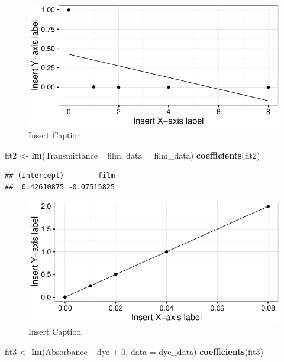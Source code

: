 \documentclass[]{article}
\newenvironment{Shaded}{\begin{snugshade}}{\end{snugshade}}
\newcommand{\KeywordTok}[1]{\textcolor[rgb]{0.13,0.29,0.53}{\textbf{{#1}}}}
\newcommand{\DataTypeTok}[1]{\textcolor[rgb]{0.13,0.29,0.53}{{#1}}}
\newcommand{\DecValTok}[1]{\textcolor[rgb]{0.00,0.00,0.81}{{#1}}}
\newcommand{\StringTok}[1]{\textcolor[rgb]{0.31,0.60,0.02}{{#1}}}
\newcommand{\NormalTok}[1]{{#1}}
\begin{document}
\begin{figure}[htbp]
\centering
\includegraphics{Beers_Law_files/figure-latex/unnamed-chunk-2-1.pdf}
\caption{Insert Caption}
\end{figure}

\begin{Shaded}
\begin{Highlighting}[]
\NormalTok{fit2 <-}\StringTok{ }\KeywordTok{lm}\NormalTok{(Transmittance ~}\StringTok{ }\NormalTok{film, }\DataTypeTok{data =} \NormalTok{film_data)}
\KeywordTok{coefficients}\NormalTok{(fit2)}
\end{Highlighting}
\end{Shaded}

\begin{verbatim}
## (Intercept)        film 
##  0.42610875 -0.07515825
\end{verbatim}

\begin{figure}[htbp]
\centering
\includegraphics{Beers_Law_files/figure-latex/unnamed-chunk-3-1.pdf}
\caption{Insert Caption}
\end{figure}

\begin{Shaded}
\begin{Highlighting}[]
\NormalTok{fit3 <-}\StringTok{ }\KeywordTok{lm}\NormalTok{(Absorbance ~}\StringTok{ }\NormalTok{dye +}\StringTok{ }\DecValTok{0}\NormalTok{, }\DataTypeTok{data =} \NormalTok{dye_data)}
\KeywordTok{coefficients}\NormalTok{(fit3)}
\end{Highlighting}
\end{Shaded}
\end{document}
